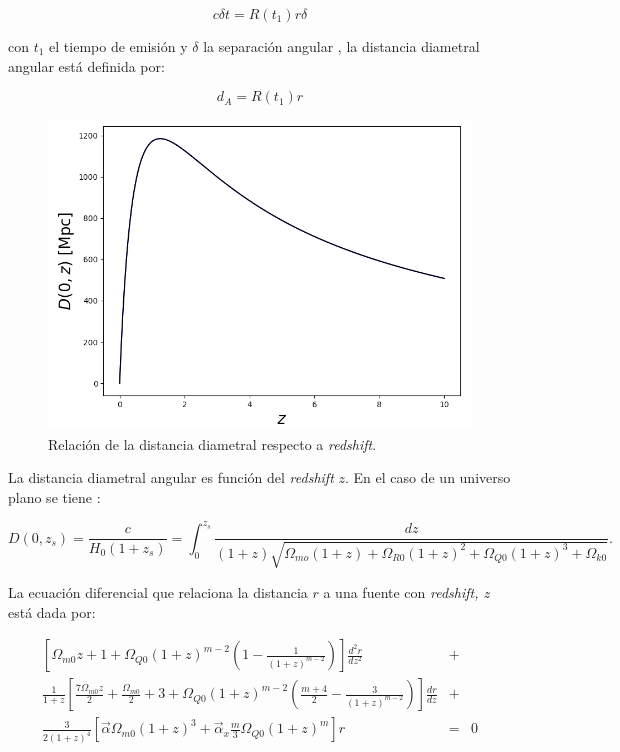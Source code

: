 $$c \delta t = R(t_1) r \delta $$ 

con $t_1$ el tiempo de emisión y $\delta$ la separación angular , la distancia diametral angular está definida por:

$$ d_A = R(t_1) r $$

\begin{figure}
\centering%
\includegraphics[width=0.9\columnwidth]{Kap3/d_A.png}%
\caption{Relación de la distancia diametral respecto a \emph{redshift}.}
\label{fig:grav_lens_1}
\end{figure}

La distancia diametral angular es función del \emph{redshift} $z$. En el caso de un universo plano se tiene \cite{CA10}:

\begin{equation}
D(0, z_s) = \frac{c}{H_0 (1+z_s)} = \int_0^{z_s} \frac{dz}{(1+z)\sqrt{\Omega_{mo}(1+z) + \Omega_{R0}(1+z)^2 +\Omega_{Q0}(1+z)^3 +\Omega_{k0} }}.
\end{equation}

La ecuación diferencial que relaciona la distancia $r$ a una fuente con \emph{redshift, z} está dada por:

\begin{eqnarray}
\left [  \Omega_{m0}z + 1 + \Omega_{Q0}(1+z)^{m-2} \left ( 1-\frac{1}{(1+z)^{m-2} } \right ) \right ] \frac{d^2 r}{d z^2} &+& \\
\frac{1}{1+z} \left [ \frac{7 \Omega_{m0}z }{2} + \frac{\Omega_{m0}}{2} + 3 + \Omega_{Q0} (1+z)^{m-2} \left ( \frac{m+4}{2} - \frac{3}{(1+z)^{m-2}} \right ) \right ] \frac{d r}{d z} &+& \\
\frac{3}{2(1+z)^4} \left [ \vec{\alpha} \Omega_{m0} (1+z)^3 + \vec{\alpha}_x \frac{m}{3} \Omega_{Q0} (1+z)^m \right ] r &=& 0
\end{eqnarray}

